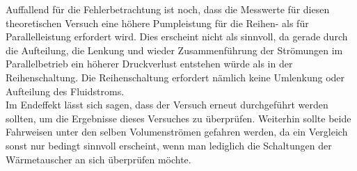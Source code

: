 Auffallend für die Fehlerbetrachtung ist noch, dass die Messwerte für diesen theoretischen Versuch eine höhere Pumpleistung für die Reihen- als für Parallelleistung erfordert wird. Dies erscheint nicht als sinnvoll, da gerade durch die Aufteilung, die Lenkung und wieder Zusammenführung der Strömungen im Parallelbetrieb ein höherer Druckverlust entstehen würde als in der Reihenschaltung. Die Reihenschaltung erfordert nämlich keine Umlenkung oder Aufteilung des Fluidstroms.\\

Im Endeffekt lässt sich sagen, dass der Versuch erneut durchgeführt werden sollten, um die Ergebnisse dieses Versuches zu überprüfen. Weiterhin sollte beide Fahrweisen unter den selben Volumenströmen gefahren werden, da ein Vergleich sonst nur bedingt sinnvoll erscheint, wenn man lediglich die Schaltungen der Wärmetauscher an sich überprüfen möchte.